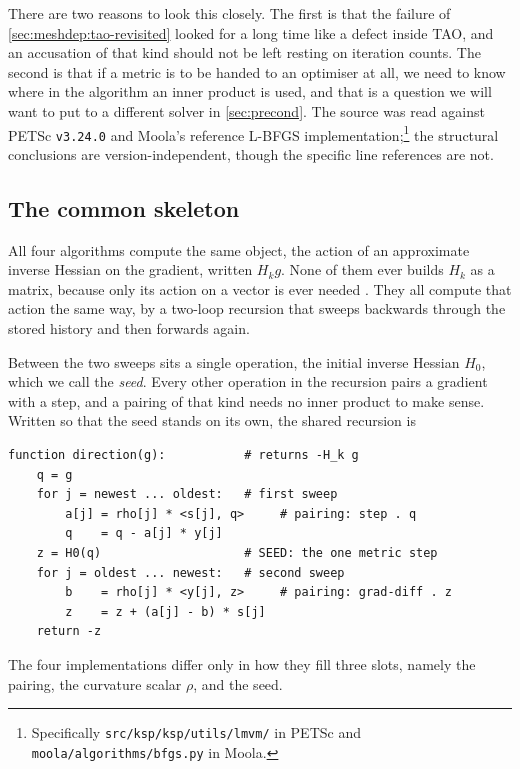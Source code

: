\documentclass[a4paper,11pt]{article}
\theoremstyle{spacedplain} \newtheorem{theorem}[counter]{Theorem} \newtheorem{lemma}[counter]{Lemma} \newtheorem{prop}[counter]{Proposition} \newtheorem{cor}[counter]{Corollary}
\theoremstyle{spaceddefinition} \newtheorem{defn}[counter]{Definition} \newtheorem{example}[counter]{Example} \newtheorem{remark}[counter]{Remark}
\begin{document}
There are two reasons to look this closely. The first is that the failure of \cref{sec:meshdep:tao-revisited} looked for a long time like a defect inside TAO, and an accusation of that kind should not be left resting on iteration counts. The second is that if a metric is to be handed to an optimiser at all, we need to know where in the algorithm an inner product is used, and that is a question we will want to put to a different solver in \cref{sec:precond}. The source was read against PETSc \texttt{v3.24.0} and Moola's reference L-BFGS implementation;\footnote{Specifically \texttt{src/ksp/ksp/utils/lmvm/} in PETSc and \texttt{moola/algorithms/bfgs.py} in Moola.} the structural conclusions are version-independent, though the specific line references are not.

\subsection{The common skeleton}
\label{sec:lbfgs:skeleton}

All four algorithms compute the same object, the action of an approximate inverse Hessian on the gradient, written $H_k g$. None of them ever builds $H_k$ as a matrix, because only its action on a vector is ever needed \citep[Sect.~1.5.4.2]{shfp2017}. They all compute that action the same way, by a two-loop recursion that sweeps backwards through the stored history and then forwards again.

Between the two sweeps sits a single operation, the initial inverse Hessian $H_0$, which we call the \emph{seed}. Every other operation in the recursion pairs a gradient with a step, and a pairing of that kind needs no inner product to make sense. Written so that the seed stands on its own, the shared recursion is

\begin{lstlisting}
function direction(g):           # returns -H_k g
    q = g
    for j = newest ... oldest:   # first sweep
        a[j] = rho[j] * <s[j], q>     # pairing: step . q
        q    = q - a[j] * y[j]
    z = H0(q)                    # SEED: the one metric step
    for j = oldest ... newest:   # second sweep
        b    = rho[j] * <y[j], z>     # pairing: grad-diff . z
        z    = z + (a[j] - b) * s[j]
    return -z
\end{lstlisting}

The four implementations differ only in how they fill three slots, namely the pairing, the curvature scalar $\rho$, and the seed.
\end{document}
